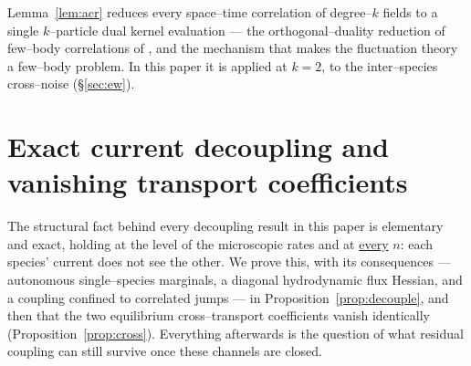 \documentclass[11pt]{article}
\theoremstyle{plain}
\theoremstyle{definition}
\theoremstyle{remark}
\begin{document}
\noindent Lemma~\ref{lem:acr} reduces every space--time correlation of degree--$k$
fields to a single $k$--particle dual kernel evaluation --- the orthogonal--duality
reduction of few--body correlations of \cite{ACR,ACR2}, and the mechanism that makes the
fluctuation theory a few--body problem. In this paper it is applied at $k=2$, to the
inter--species cross--noise (\S\ref{sec:ew}).

\section{Exact current decoupling and vanishing transport coefficients}\label{sec:decouple}

The structural fact behind every decoupling result in this paper is elementary and
exact, holding at the level of the microscopic rates and at \underline{every} $n$: each
species' current does not see the other. We prove this, with its consequences ---
autonomous single--species marginals, a diagonal hydrodynamic flux Hessian, and a
coupling confined to correlated jumps --- in Proposition~\ref{prop:decouple}, and then
that the two equilibrium cross--transport coefficients vanish identically
(Proposition~\ref{prop:cross}). Everything afterwards is the question of what residual
coupling can still survive once these channels are closed.
\end{document}
